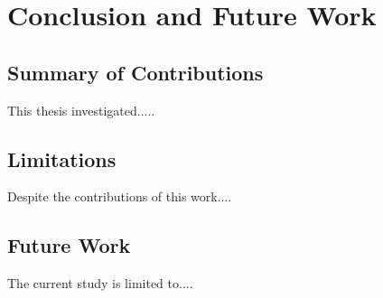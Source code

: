 \chapter{Conclusion and Future Work}

\section{Summary of Contributions}

This thesis investigated.....
\section{Limitations}

Despite the contributions of this work....

\section{Future Work}

The current study is limited to....